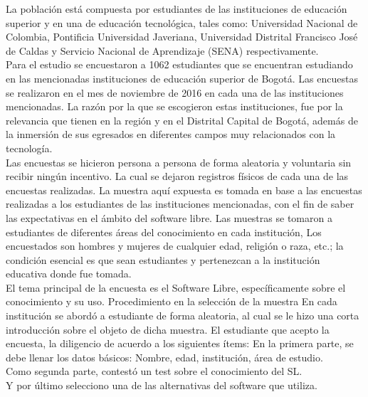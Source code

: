 \begin{multicols}{2}

La poblaci\'on est\'a compuesta por estudiantes de las  instituciones de educaci\'on superior y en una de educaci\'on tecnol\'ogica, tales como: Universidad Nacional de Colombia, Pontificia Universidad Javeriana, Universidad Distrital Francisco Jos\'e de Caldas y Servicio Nacional de Aprendizaje (SENA) respectivamente. \\

Para el estudio se encuestaron a 1062 estudiantes que se encuentran estudiando en las mencionadas instituciones de educaci\'on superior de Bogot\'a. Las encuestas se realizaron en el mes de noviembre de 2016 en cada una de las instituciones mencionadas.
La raz\'on por la que se escogieron estas instituciones, fue por la relevancia que tienen en la regi\'on y en el Distrital Capital de Bogot\'a, adem\'as de la inmersi\'on de sus egresados en diferentes campos muy relacionados con la tecnolog\'ia.\\

Las encuestas se hicieron persona a persona de forma 	aleatoria y voluntaria sin recibir ning\'un incentivo. La cual se dejaron registros f\'isicos de cada una de las encuestas realizadas. La muestra aqu\'i expuesta es tomada en base a las encuestas realizadas a los estudiantes de las instituciones mencionadas, con el fin de saber las expectativas en el \'ambito del software libre. Las muestras se tomaron a estudiantes de diferentes \'areas del conocimiento en cada instituci\'on, Los encuestados son hombres y mujeres de cualquier edad, religi\'on o raza, etc.; la condici\'on esencial es que sean estudiantes y pertenezcan a la instituci\'on educativa donde fue tomada.\\

El tema principal de la encuesta es el Software Libre, espec\'ificamente sobre el conocimiento y su uso.
Procedimiento en la selecci\'on de la muestra
En cada instituci\'on se abord\'o a estudiante de forma aleatoria, al cual se le hizo una corta introducci\'on sobre el objeto de dicha muestra. El estudiante que acepto la encuesta, la diligencio de acuerdo a los siguientes \'items:
	En la primera parte, se debe llenar los datos b\'asicos: Nombre, edad, instituci\'on, \'area de estudio.\\
	Como segunda parte, contest\'o un test sobre el conocimiento del SL.\\
	Y por \'ultimo selecciono una de las alternativas del software que utiliza.\\
    

\end{multicols}
